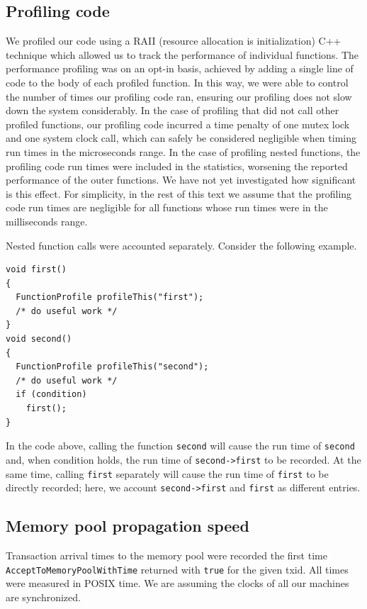 \documentclass{article}
\begin{document}
\subsection{Profiling code}
We profiled our code using a RAII (resource allocation is initialization) C++ technique which allowed us to track the performance of individual functions. The performance profiling was on an opt-in basis, achieved by adding a single line of code to the body of each profiled function. In this way, we were able to control the number of times our profiling code ran, ensuring our profiling does not slow down the system considerably. In the case of profiling that did not call other profiled functions, our profiling code incurred a time penalty of one mutex lock and one system clock call, which can safely be considered negligible when timing run times in the microseconds range. In the case of profiling nested functions, the profiling code run times were included in the statistics, worsening the reported performance of the outer functions. We have not yet investigated how significant is this effect. For simplicity, in the rest of this text we assume that the profiling code run times are negligible for all functions whose run times were in the milliseconds range. 

Nested function calls were accounted separately. Consider the following example.

\noindent\hfil\begin{minipage}{5cm}
\begin{verbatim}
void first()
{ 
  FunctionProfile profileThis("first");
  /* do useful work */  
}
void second()
{ 
  FunctionProfile profileThis("second");
  /* do useful work */  
  if (condition)
    first();
}
\end{verbatim}
\end{minipage}\hfil

In the code above, calling the function \verb|second| will cause the run time of \verb|second| and, when condition holds, the run time of \verb|second->first| to be recorded. At the same time, calling \verb|first| separately will cause the run time of \verb|first| to be directly recorded; here, we account \verb|second->first| and \verb|first| as different entries.

\subsection{Memory pool propagation speed}
Transaction arrival times to the memory pool were recorded the first time  \verb|AcceptToMemoryPoolWithTime| returned with \verb|true| for the given txid. All times were measured in POSIX time. We are assuming the clocks of all our machines are synchronized.
\end{document}
